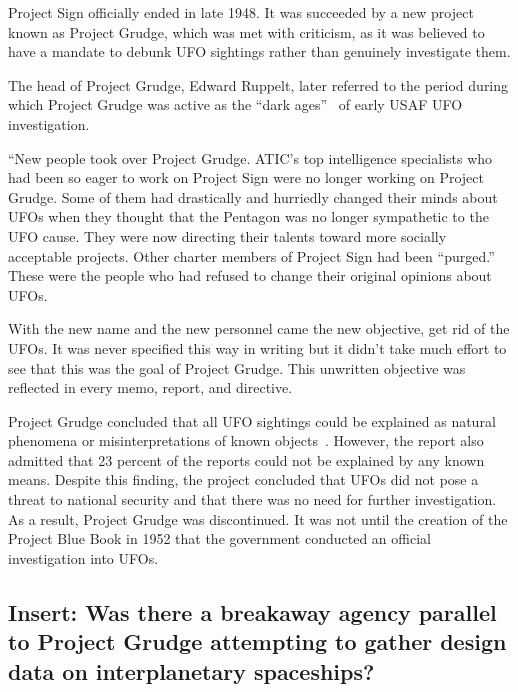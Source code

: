 Project Sign officially ended in late 1948. It was succeeded by a new project known as Project Grudge, which was met with criticism, as it was believed to have a mandate to debunk UFO sightings rather than genuinely investigate them.

The head of Project Grudge, Edward Ruppelt, later referred to the period during which Project Grudge was active as the ``dark ages''~\cite[Chapter~5]{Ruppelt2011May} of early USAF UFO investigation.
\begin{svgraybox}
``New people took over Project Grudge. ATIC's top intelligence specialists who had been so eager to work on Project Sign
were no longer working on Project Grudge. Some of them had drastically and hurriedly changed their minds about
      UFOs  when they thought that the Pentagon was no longer sympathetic to the UFO cause.
They were now directing their talents toward more socially acceptable projects.
 Other charter members of Project Sign had been ``purged.'' These were the people who had refused to change their original opinions about UFOs.


      With the new name and the new personnel came the new objective, get rid of the UFOs.
It was never specified this way in writing but it didn't take much effort to see that this was the goal of Project Grudge.
This unwritten objective was reflected in every memo, report, and directive.
\end{svgraybox}


Project Grudge concluded that all UFO sightings could be explained as natural phenomena or misinterpretations of known objects~\cite[Chapter~4]{Jacobsen2011}. However, the report also admitted that 23 percent of the reports could not be explained by any known means. Despite this finding, the project concluded that UFOs did not pose a threat to national security and that there was no need for further investigation. As a result, Project Grudge was discontinued. It was not until the creation of the Project Blue Book in 1952 that the government conducted an official investigation into UFOs.

\subsection{Insert: Was there a breakaway agency parallel to Project Grudge attempting to gather design data on interplanetary spaceships?}
\label{2023-UFO-part-Perception-types-USA-baa}

